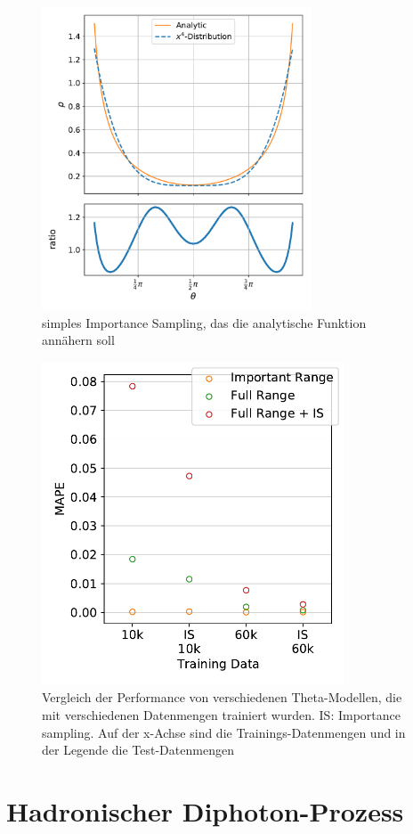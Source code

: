 \begin{figure}
	\centering
	\includegraphics[width=8cm]{graphics/4}
	\caption{simples Importance Sampling, das die analytische Funktion annähern soll}
\end{figure}

\begin{figure}
	\centering
	\includegraphics[width=9cm]{graphics/26}
	\caption{Vergleich der Performance von verschiedenen Theta-Modellen, die mit verschiedenen Datenmengen trainiert wurden. IS: Importance sampling. Auf der x-Achse sind die Trainings-Datenmengen und in der Legende die Test-Datenmengen}
\end{figure}

\section{Hadronischer Diphoton-Prozess}
